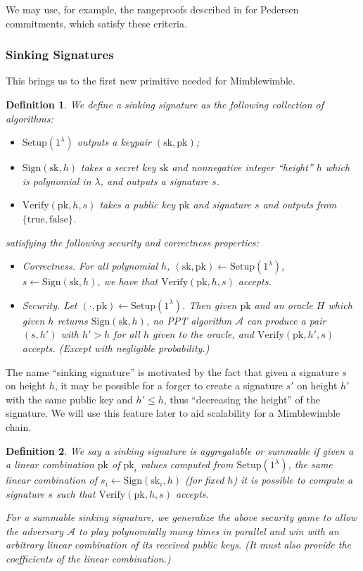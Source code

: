 \documentclass[letterpaper]{article}
\newtheorem{defn}{Definition}
\newcommand{\Setup}{\mathrm{Setup}}
\newcommand{\Sign}{\mathrm{Sign}}
\newcommand{\Verify}{\mathrm{Verify}}
\newcommand{\sk}{\mathrm{sk}}
\newcommand{\pk}{\mathrm{pk}}
\newcommand{\truth}{\{\mathrm{true}, \mathrm{false}\}}
\begin{document}
We may use, for example, the rangeproofs described in \cite{maxwell2015}
for Pedersen commitments, which satisfy these criteria.

\subsubsection{Sinking Signatures}

This brings us to the first new primitive needed for Mimblewimble.

\begin{defn} We define a \emph{sinking signature} as the following
collection of algorithms:
\begin{itemize}
\item $\Setup(1^\lambda)$ outputs a keypair $(\sk, \pk)$;
\item $\Sign(\sk, h)$ takes a secret key $\sk$ and nonnegative integer
``height'' $h$ which is polynomial in $\lambda$, and outputs a signature $s$.
\item $\Verify(\pk, h, s)$ takes a public key $\pk$ and signature $s$ and
outputs from $\truth$.
\end{itemize}
satisfying the following security and correctness properties:
\begin{itemize}
\item Correctness. For all polynomial $h$, $(\sk, \pk)\gets\Setup(1^\lambda)$,
$s\gets\Sign(\sk, h)$, we have that $\Verify(\pk, h, s)$ accepts.
\item Security. Let $(\cdot, \pk)\gets\Setup(1^\lambda)$. Then given $\pk$ and
an oracle $H$ which given $h$ returns $\Sign(\sk, h)$, no PPT algorithm
$\mathcal{A}$ can produce a pair $(s, h')$ with $h'>h$ for all $h$ given to
the oracle, and $\Verify(\pk, h', s)$ accepts.
(Except with negligible probability.)
\end{itemize}\label{sinkingsig}
\end{defn}

The name ``sinking signature'' is motivated by the fact that given a signature
$s$ on height $h$, it may be possible for a forger to create a signature $s'$
on height $h'$ with the same public key and $h' \leq h$, thus ``decreasing the
height'' of the signature. We will use this feature later to aid scalability for
a Mimblewimble chain.

\begin{defn} We say a sinking signature is \emph{aggregatable} or \emph{summable}
if given a a linear combination $\pk$ of $\pk_i$ values computed from $\Setup(1^\lambda)$,
the same linear combination of $s_i\gets\Sign(\sk_i, h)$ (for fixed $h$) it
is possible to compute a signature $s$ such that $\Verify(\pk, h, s)$ accepts.

For a summable sinking signature, we generalize the above security game to allow
the adversary $\mathcal{A}$ to play polynomially many times in parallel and win
with an arbitrary linear combination of its received public keys. (It must also
provide the coefficients of the linear combination.)
\label{homodef}
\end{defn}
\end{document}
